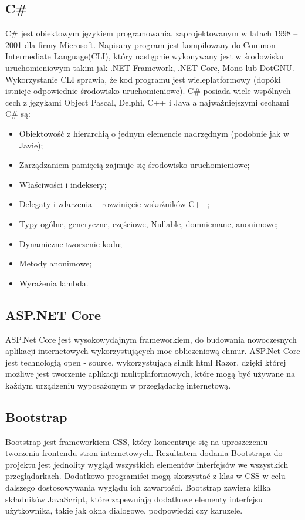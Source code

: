 \documentclass[12pt,a4paper]{article}
\begin{document}
		\subsection{C\#}
			C\# jest obiektowym językiem programowania, zaprojektowanym w latach 1998 – 2001 dla firmy Microsoft.
			Napisany program jest kompilowany do Common Intermediate Language(CLI), który następnie wykonywany jest w środowisku uruchomieniowym takim jak .NET Framework,
			.NET Core, Mono lub DotGNU.
			Wykorzystanie CLI sprawia, że kod programu jest wieleplatformowy (dopóki istnieje odpowiednie środowisko uruchomieniowe).
			C\# posiada wiele wspólnych cech z językami Object Pascal, Delphi, C++ i Java a najważniejszymi cechami C\# są:
			\begin{itemize}
				\item Obiektowość z hierarchią o jednym elemencie nadrzędnym (podobnie jak w Javie);
				\item Zarządzaniem pamięcią zajmuje się środowisko uruchomieniowe;
				\item Właściwości i indeksery;
				\item Delegaty i zdarzenia – rozwinięcie wskaźników C++;
				\item Typy ogólne, generyczne, częściowe, Nullable, domniemane, anonimowe;
				\item Dynamiczne tworzenie kodu;
				\item Metody anonimowe;
				\item Wyrażenia lambda.
			\end{itemize}
			
		\subsection{ASP.NET Core}
			ASP.Net Core jest wysokowydajnym frameworkiem, do budowania nowoczesnych aplikacji internetowych wykorzystujących moc obliczeniową chmur. ASP.Net Core jest technologią open - source,
			wykorzystującą silnik html Razor, dzięki której możliwe jest tworzenie aplikacji mulitplaformowych, które mogą być używane na każdym urządzeniu wyposażonym w przeglądarkę
			internetową.
			
		\subsection{Bootstrap}		
			Bootstrap jest frameworkiem CSS, który koncentruje się na uproszczeniu tworzenia frontendu stron internetowych. Rezultatem dodania Bootstrapa do projektu jest jednolity wygląd
			wszystkich elementów interfejsów we wszystkich przeglądarkach. Dodatkowo programiści mogą skorzystać z klas w CSS w celu dalszego dostosowywania wyglądu ich zawartości. Bootstrap
			zawiera kilka składników JavaScript, które zapewniają dodatkowe elementy interfejsu użytkownika, takie jak okna dialogowe, podpowiedzi czy karuzele. 
\end{document}
